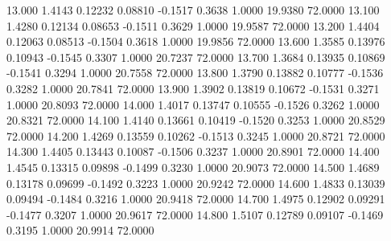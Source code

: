   13.000   1.4143   0.12232   0.08810  -0.1517   0.3638   1.0000  19.9380  72.0000
  13.100   1.4280   0.12134   0.08653  -0.1511   0.3629   1.0000  19.9587  72.0000
  13.200   1.4404   0.12063   0.08513  -0.1504   0.3618   1.0000  19.9856  72.0000
  13.600   1.3585   0.13976   0.10943  -0.1545   0.3307   1.0000  20.7237  72.0000
  13.700   1.3684   0.13935   0.10869  -0.1541   0.3294   1.0000  20.7558  72.0000
  13.800   1.3790   0.13882   0.10777  -0.1536   0.3282   1.0000  20.7841  72.0000
  13.900   1.3902   0.13819   0.10672  -0.1531   0.3271   1.0000  20.8093  72.0000
  14.000   1.4017   0.13747   0.10555  -0.1526   0.3262   1.0000  20.8321  72.0000
  14.100   1.4140   0.13661   0.10419  -0.1520   0.3253   1.0000  20.8529  72.0000
  14.200   1.4269   0.13559   0.10262  -0.1513   0.3245   1.0000  20.8721  72.0000
  14.300   1.4405   0.13443   0.10087  -0.1506   0.3237   1.0000  20.8901  72.0000
  14.400   1.4545   0.13315   0.09898  -0.1499   0.3230   1.0000  20.9073  72.0000
  14.500   1.4689   0.13178   0.09699  -0.1492   0.3223   1.0000  20.9242  72.0000
  14.600   1.4833   0.13039   0.09494  -0.1484   0.3216   1.0000  20.9418  72.0000
  14.700   1.4975   0.12902   0.09291  -0.1477   0.3207   1.0000  20.9617  72.0000
  14.800   1.5107   0.12789   0.09107  -0.1469   0.3195   1.0000  20.9914  72.0000
